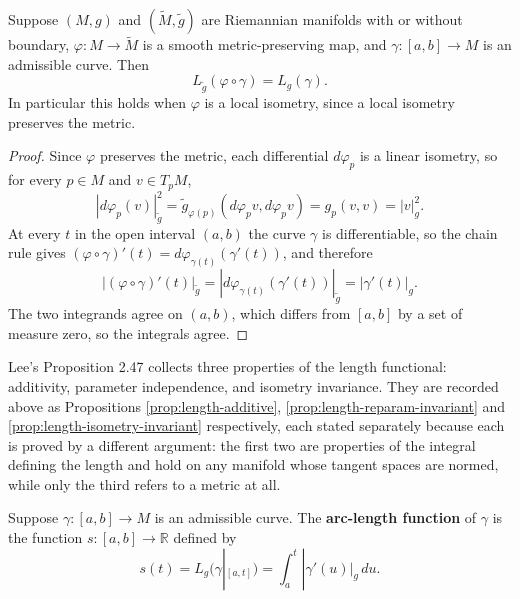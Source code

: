 \begin{proposition}
\label{prop:length-isometry-invariant}
\leanok
{}
Suppose $(M,g)$ and $(\tilde{M},\tilde{g})$ are Riemannian manifolds with or without boundary, $\varphi: M \to \tilde{M}$ is a smooth metric-preserving map, and $\gamma : [a,b] \to M$ is an admissible curve. Then
\[
  L_{\tilde{g}}(\varphi \circ \gamma) = L_g(\gamma).
\]
In particular this holds when $\varphi$ is a local isometry, since a local isometry preserves the metric.
\end{proposition}

\begin{proof}
\leanok
{}
Since $\varphi$ preserves the metric, each differential $d\varphi_p$ is a linear isometry, so for every $p \in M$ and $v \in T_p M$,
\[
  |d\varphi_p(v)|_{\tilde{g}}^2 = \tilde{g}_{\varphi(p)}(d\varphi_p v, d\varphi_p v) = g_p(v,v) = |v|_g^2 .
\]
At every $t$ in the open interval $(a,b)$ the curve $\gamma$ is differentiable, so the chain rule gives $(\varphi \circ \gamma)'(t) = d\varphi_{\gamma(t)}(\gamma'(t))$, and therefore
\[
  |(\varphi \circ \gamma)'(t)|_{\tilde{g}} = |d\varphi_{\gamma(t)}(\gamma'(t))|_{\tilde{g}} = |\gamma'(t)|_g .
\]
The two integrands agree on $(a,b)$, which differs from $[a,b]$ by a set of measure zero, so the integrals agree.
\end{proof}

Lee's Proposition 2.47 collects three properties of the length functional: additivity, parameter independence, and isometry invariance. They are recorded above as Propositions \ref{prop:length-additive}, \ref{prop:length-reparam-invariant} and \ref{prop:length-isometry-invariant} respectively, each stated separately because each is proved by a different argument: the first two are properties of the integral defining the length and hold on any manifold whose tangent spaces are normed, while only the third refers to a metric at all.

\begin{exercise}
\label{exer:prove-prop-247}
\leanok
{}
\end{exercise}

Suppose $\gamma : [a, b] \to M$ is an admissible curve. The \textbf{arc-length function} of $\gamma$ is the function $s : [a, b] \to \mathbb{R}$ defined by
\[s(t) = L_g(\gamma|_{[a,t]}) = \int_a^t |\gamma'(u)|_g \, du.\]

